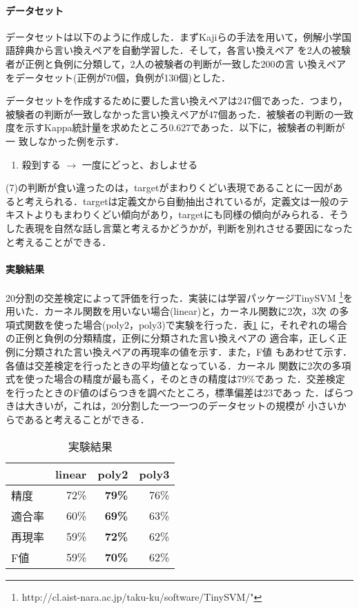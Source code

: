 \documentclass{nlp}
\begin{document}
\paragraph{データセット}
データセットは以下のように作成した．まずKajiらの手法を用いて，例解小学国
語辞典\cite{RSK97}から言い換えペアを自動学習した．そして，各言い換えペア
を2人の被験者が正例と負例に分類して，2人の被験者の判断が一致した200の言
い換えペアをデータセット(正例が70個，負例が130個)とした．

データセットを作成するために要した言い換えペアは247個であった．つまり，
被験者の判断が一致しなかった言い換えペアが47個あった．被験者の判断の一致
度を示すKappa統計量を求めたところ0.627であった．以下に，被験者の判断が一
致しなかった例を示す．
\vspace{10pt}
\begin{enumerate}
 \item 殺到する $\rightarrow$ 一度にどっと、おしよせる
\end{enumerate}
\vspace{10pt}
(7)の判断が食い違ったのは，targetがまわりくどい表現であることに一因があ
ると考えられる．targetは定義文から自動抽出されているが，定義文は一般のテ
キストよりもまわりくどい傾向があり，targetにも同様の傾向がみられる．そう
した表現を自然な話し言葉と考えるかどうかが，判断を別れさせる要因になった
と考えることができる．


\paragraph{実験結果}
20分割の交差検定によって評価を行った．実装には学習パッケージTinySVM
\footnote{
http://cl.aist-nara.ac.jp/{\tt{}}taku-ku/software/TinySVM/"
}を用いた．カーネル関数を用いない場合(linear)と，カーネル関数に2次，3次
の多項式関数を使った場合(poly2，poly3)で実験を行った．表\ref{tab:result}
に，それぞれの場合の正例と負例の分類精度，正例に分類された言い換えペアの
適合率，正しく正例に分類された言い換えペアの再現率の値を示す．また，F値
もあわせて示す．各値は交差検定を行ったときの平均値となっている．カーネル
関数に2次の多項式を使った場合の精度が最も高く，そのときの精度は79\%であっ
た．交差検定を行ったときのF値のばらつきを調べたところ，標準偏差は23であっ
た．ばらつきは大きいが，これは，20分割した一つ一つのデータセットの規模が
小さいからであると考えることができる．
\begin{table}[h]
 \caption{実験結果}
 \label{tab:result}
\begin{center}
  \begin{tabular}{l||r|r|r}\hline
             & linear & poly2      & poly3 \\ \hline
   精度      & 72\%   & \bf{79\%}  & 76\%  \\
   適合率    & 60\%   & \bf{69\%}  & 63\%  \\
   再現率    & 59\%   & \bf{72\%}  & 62\%  \\
   F値      & 59\%   & \bf{70\%}  & 62\%  \\ \hline
  \end{tabular}
\end{center}
\end{table}
\end{document}
